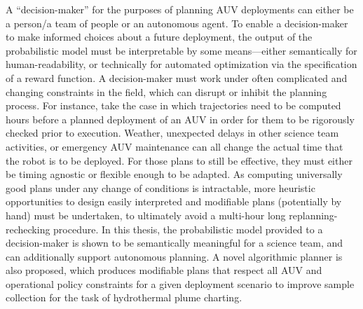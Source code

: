 A ``decision-maker'' for the purposes of planning AUV deployments can either be a person/a team of people or an autonomous agent.  
To enable a decision-maker to make informed choices about a future deployment, the output of the probabilistic model must be interpretable by some means---either semantically for human-readability, or technically for automated optimization via the specification of a reward function.
A decision-maker must work under often complicated and changing constraints in the field, which can disrupt or inhibit the planning process.
For instance, take the case in which trajectories need to be computed hours before a planned deployment of an AUV in order for them to be rigorously checked prior to execution.
Weather, unexpected delays in other science team activities, or emergency AUV maintenance can all change the actual time that the robot is to be deployed.
For those plans to still be effective, they must either be timing agnostic or flexible enough to be adapted.
As computing universally good plans under any change of conditions is intractable, more heuristic opportunities to design easily interpreted and modifiable plans (potentially by hand) must be undertaken, to ultimately avoid a multi-hour long replanning-rechecking procedure.
In this thesis, the probabilistic model provided to a decision-maker is shown to be semantically meaningful for a science team, and can additionally support autonomous planning.
A novel algorithmic planner is also proposed, which produces modifiable plans that respect all AUV and operational policy constraints for a given deployment scenario to improve sample collection for the task of hydrothermal plume charting.
 

